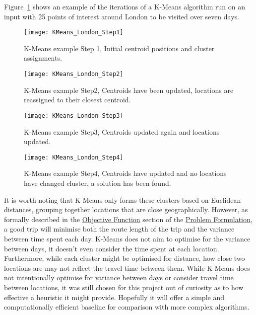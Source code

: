 \noindent
Figure~\ref{fig:KMeans_London_Step1} shows an example of the iterations of a K-Means algorithm run on an input with 25
points of interest around London to be visited over seven days.
\begin{figure}[H]
    \ContinuedFloat*
    \texttt{[image: KMeans\_London\_Step1]}
    \caption{K-Means example Step 1, Initial centroid positions and cluster assignments.}
    \label{fig:KMeans_London_Step1}
\end{figure}
\begin{figure}[H]
    \ContinuedFloat
    \texttt{[image: KMeans\_London\_Step2]}
    \caption{K-Means example Step2, Centroids have been updated, locations are reassigned to their closest centroid.}
    \label{fig:KMeans_London_Step2}
\end{figure}
\begin{figure}[H]
    \ContinuedFloat
    \texttt{[image: KMeans\_London\_Step3]}
    \caption{K-Means example Step3, Centroids updated again and locations updated.}
    \label{fig:KMeans_London_Step3}
\end{figure}
\begin{figure}[H]
    \ContinuedFloat
    \texttt{[image: KMeans\_London\_Step4]}
    \caption{K-Means example Step4, Centroids have updated and no locations have changed cluster, a solution has been found.}
    \label{fig:KMeans_London_Step4}
\end{figure}

\noindent
It is worth noting that K-Means only forms these clusters based on Euclidean distances, grouping together locations
that are close geographically.
However, as formally described in the \hyperref[subsec:objective-function]{Objective Function} section of the
\hyperref[sec:problem-formulation]{Problem Formulation}, a good trip will minimise both the route length of the trip
and the variance between time spent each day.
K-Means does not aim to optimise for the variance between days, it doesn't even consider the time spent at each
location.
Furthermore, while each cluster might be optimised for distance, how close two locations are may not reflect the travel
time between them.
While K-Means does not intentionally optimise for variance between days or consider travel time between locations, it
was still chosen for this project out of curiosity as to how effective a heuristic it might provide.
Hopefully it will offer a simple and computationally efficient baseline for comparison with more complex
algorithms.

